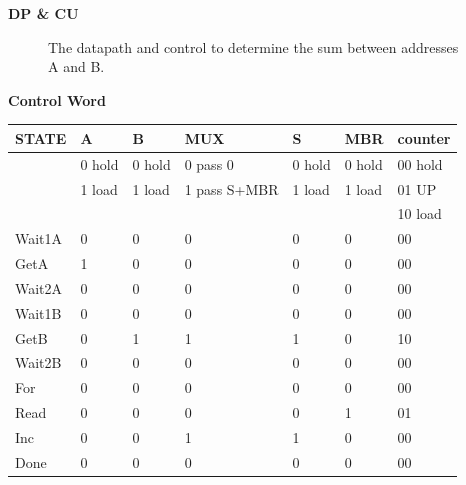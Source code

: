 \begin{enumerate}
\begin{solution}
{{\bf DP \& CU}

\begin{figure}[ht]
\caption{The datapath and control to determine the sum between
addresses A and B.}
\end{figure}


{\bf Control Word}

\begin{tabular}{l|l|l|l|l|l|l}
STATE & A      & B      &MUX          &S      &MBR    &counter	\\ \hline
      & 0 hold & 0 hold &0 pass 0     &0 hold &0 hold &00 hold	\\ \hline
      & 1 load & 1 load &1 pass S+MBR &1 load &1 load &01 UP	\\ \hline
      &        &        &             &       &       &10 load	\\ \hline
Wait1A& 0      & 0      &0            &0      &0      &00	\\ \hline
GetA  & 1      & 0      &0            &0      &0      &00	\\ \hline
Wait2A& 0      & 0      &0            &0      &0      &00	\\ \hline
Wait1B& 0      & 0      &0            &0      &0      &00	\\ \hline
GetB  & 0      & 1      &1            &1      &0      &10	\\ \hline
Wait2B& 0      & 0      &0            &0      &0      &00	\\ \hline
For   & 0      & 0      &0            &0      &0      &00	\\ \hline
Read  & 0      & 0      &0            &0      &1      &01	\\ \hline
Inc   & 0      & 0      &1            &1      &0      &00	\\ \hline
Done  & 0      & 0      &0            &0      &0      &00	\\ 
\end{tabular}

}
\end{solution}
\end{enumerate}
